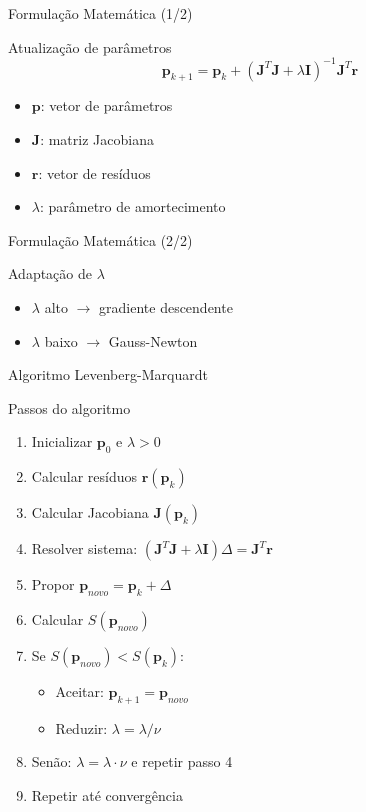 \begin{frame}{Formulação Matemática (1/2)}
\begin{block}{Atualização de parâmetros}
$$\mathbf{p}_{k+1} = \mathbf{p}_k + (\mathbf{J}^T\mathbf{J} + \lambda \mathbf{I})^{-1} \mathbf{J}^T \mathbf{r}$$
\end{block}

\begin{itemize}
    \item $\mathbf{p}$: vetor de parâmetros
    \item $\mathbf{J}$: matriz Jacobiana
    \item $\mathbf{r}$: vetor de resíduos
    \item $\lambda$: parâmetro de amortecimento
\end{itemize}
\end{frame}

\begin{frame}{Formulação Matemática (2/2)}
\begin{block}{Adaptação de $\lambda$}
\begin{itemize}
    \item $\lambda$ alto $\to$ gradiente descendente
    \item $\lambda$ baixo $\to$ Gauss-Newton
\end{itemize}
\end{block}

\end{frame}

\begin{frame}{Algoritmo Levenberg-Marquardt}
\begin{block}{Passos do algoritmo}
\begin{enumerate}
    \item Inicializar $\mathbf{p}_0$ e $\lambda > 0$
    \item Calcular resíduos $\mathbf{r}(\mathbf{p}_k)$
    \item Calcular Jacobiana $\mathbf{J}(\mathbf{p}_k)$
    \item Resolver sistema: $(\mathbf{J}^T\mathbf{J} + \lambda \mathbf{I}) \Delta = \mathbf{J}^T \mathbf{r}$
    \item Propor $\mathbf{p}_{novo} = \mathbf{p}_k + \Delta$
    \item Calcular $S(\mathbf{p}_{novo})$
    \item Se $S(\mathbf{p}_{novo}) < S(\mathbf{p}_k)$:
    \begin{itemize}
        \item Aceitar: $\mathbf{p}_{k+1} = \mathbf{p}_{novo}$
        \item Reduzir: $\lambda = \lambda / \nu$
    \end{itemize}
    \item Senão: $\lambda = \lambda \cdot \nu$ e repetir passo 4
    \item Repetir até convergência
\end{enumerate}
\end{block}
\end{frame}

